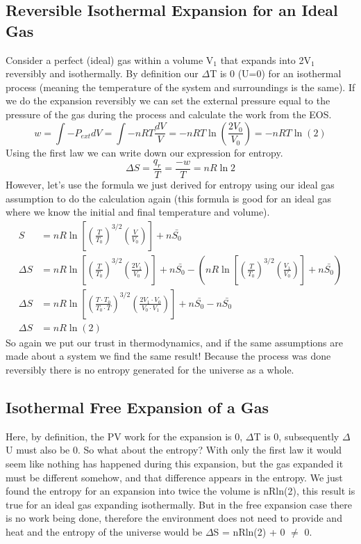 \documentclass{article}
\begin{document}
 \subsection*{Reversible Isothermal Expansion for an Ideal Gas}
 Consider a perfect (ideal) gas within a volume V$_1$ that expands into 2V$_1$ reversibly and isothermally. 
 By definition our $\Delta$T is 0 (U=0) for an isothermal process (meaning the temperature of the system and surroundings is the same). 
 If we do the expansion reversibly we can set the external pressure equal to the pressure of the gas during the process and calculate the work from the EOS. 
 \begin{equation}
     w = \int -P_{ext}dV = \int -nRT \frac{dV}{V} = -nRT \ln\left(\frac{2V_0}{V_0} \right) = -nRT\ln(2)
 \end{equation}
 Using the first law we can write down our expression for entropy. 
 \begin{equation}
     \Delta S = \frac{q_r}{T} = \frac{-w}{T} = nR\ln 2
 \end{equation}
 However, let's use the formula we just derived for entropy using our ideal gas assumption to do the calculation again (this formula is good for an ideal gas where we know the initial and final temperature and volume). 
 \begin{equation}
 \begin{split}
S &= nR\ln\left[ \left(\frac{T}{T_0} \right)^{3/2} \left(\frac{V}{V_0} \right) \right ] + n\bar{S_0} \\
\Delta S &= nR\ln\left[ \left(\frac{T}{T_0} \right)^{3/2} \left(\frac{2V_1}{V_0} \right) \right ] + n\bar{S_0} - \left (nR\ln\left[ \left(\frac{T}{T_0} \right)^{3/2} \left(\frac{V_1}{V_0} \right) \right ] + n\bar{S_0} \right)\\
\Delta S &= nR\ln\left[ \left(\frac{T\cdot T_0}{T_0\cdot T} \right)^{3/2} \left(\frac{2V_1 \cdot V_0}{V_0 \cdot V_1} \right) \right ] + n\bar{S_0} - n\bar{S_0} \\
\Delta S &= nR \ln(2)
 \end{split}
\end{equation}
 So again we put our trust in thermodynamics, and if the same assumptions are made about a system we find the same result!
 Because the process was done reversibly there is no entropy generated for the universe as a whole. 
 
 \subsection*{Isothermal Free Expansion of a Gas}
 Here, by definition, the PV work for the expansion is 0, $\Delta$T is 0, subsequently $\Delta$U must also be 0. 
 So what about the entropy?
 With only the first law it would seem like nothing has happened during this expansion, but the gas expanded it must be different somehow, and that difference appears in the entropy. 
 We just found the entropy for an expansion into twice the volume is nRln(2), this result is true for an ideal gas expanding isothermally.
 But in the free expansion case there is no work being done, therefore the environment does not need to provide and heat and the entropy of the universe would be $\Delta$S = nRln(2) + 0 $\neq$ 0.
 
\end{document}

